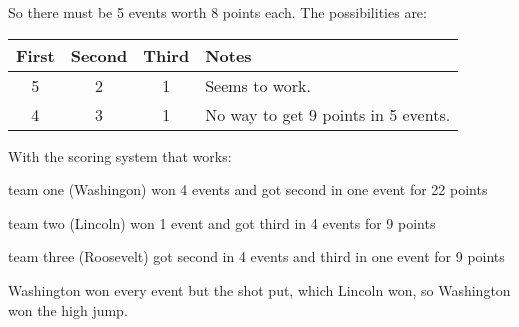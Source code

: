 \documentclass[fleqn,addpoints]{exam}
\begin{document}
\begin{questions}
\begin{solution}
So there must be 5 events worth 8 points each.  The possibilities are:

\begin{tabular}{ | c | c | c | p{4 cm} | }
  \hline
  First & Second & Third & Notes \\
  \hline
  5 & 2 & 1 &  Seems to work. \\
  4 & 3 & 1 & No way to get 9 points in 5 events.   \\
  \hline
\end{tabular}

With the scoring system that works:
\begin{itemize*}
  \item team one (Washingon) won 4 events and got second in one event for 22 points
  \item team two (Lincoln) won 1 event and got third in 4 events for 9 points
  \item team three (Roosevelt) got second in 4 events and third in one event for 9 points
\end{itemize*}

Washington won every event but the shot put, which Lincoln won, so Washington won the high jump. 

\end{solution}

\end{questions}


\ifprintanswers
\end{document}
